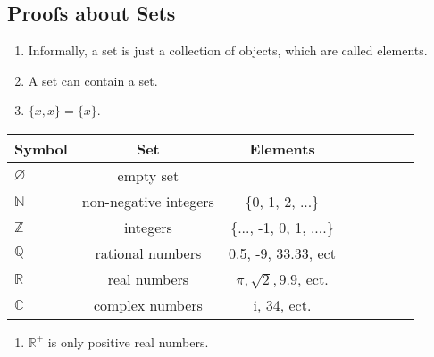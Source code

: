 \documentclass{article}
\begin{document}
\subsection{Proofs about Sets}
\begin{enumerate}
	\item Informally, a set is just a collection of objects, which are called elements.
	\item A set can contain a set.
	\item $\{x, x\} = \{x\}$.
\end{enumerate}

\begin{tabular}{l*{6}{c}r}
Symbol          & Set & Elements\\
\hline
$\varnothing$ & empty set & \\
$\mathbb{N}$ & non-negative integers& \{0, 1, 2, ...\}  \\
$\mathbb{Z}$ & integers& \{..., -1, 0, 1, ....\}  \\
$\mathbb{Q}$ & rational numbers & 0.5, -9, 33.33, ect  \\
$\mathbb{R}$   &  real numbers & $\pi, \sqrt{2}, 9.9$,  ect. \\
$\mathbb{C}$  & complex numbers &  i, 34, ect.  \\
\end{tabular}
\begin{enumerate}
	\item $\mathbb{R}^{+}$ is only positive real numbers.
\end{enumerate}
\end{document}
